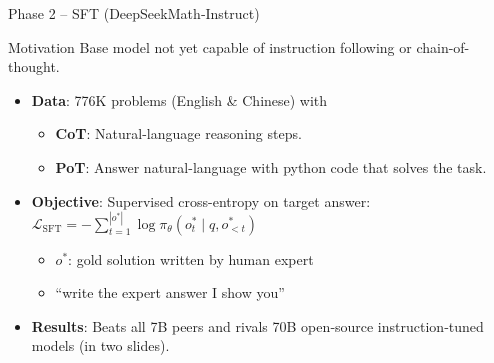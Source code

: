 \documentclass[9pt]{beamer}
\begin{document}
\begin{frame}{Phase 2 – SFT (DeepSeekMath‑Instruct)}
  \begin{block}{Motivation}
    Base model not yet capable of instruction following or chain-of-thought.
  \end{block}
  \begin{itemize}
    \item \textbf{Data}: 776K problems (English \& Chinese) with
    \begin{itemize}
        \item 
          \textbf{CoT}: Natural-language reasoning steps.
        \item 
          \textbf{PoT}: Answer natural-language with python code that solves the task.
    \end{itemize}
    \vfill\pause
    \item \textbf{Objective}: Supervised cross-entropy on target answer: $\displaystyle\mathcal L_{\text{SFT}}=-\sum_{t=1}^{|o^\ast|} \log\pi_\theta(o^\ast_t\mid q,o^\ast_{<t})$
    \begin{itemize}
        \item $o^\ast$: gold solution written by human expert
        \item “write the expert answer I show you”
    \end{itemize}
    \vfill\pause
    \item \textbf{Results}: Beats all 7B peers and rivals 70B open‑source instruction‑tuned models (in two slides).
  \end{itemize}
\end{frame}
\end{document}
